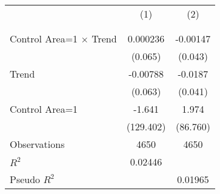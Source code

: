 {
\def\sym#1{\ifmmode^{#1}\else\(^{#1}\)\fi}
\begin{tabular}{l*{2}{c}}
\hline\hline
                    &&\\
                    &&\\
\hline
                 &               &               \\
Control Area=1 $\times$ Trend&    0.000236   &    -0.00147   \\
                    &     (0.065)   &     (0.043)   \\
[1em]
Trend               &    -0.00788   &     -0.0187   \\
                    &     (0.063)   &     (0.041)   \\
[1em]
Control Area=1      &      -1.641   &       1.974   \\
                    &   (129.402)   &    (86.760)   \\
\hline
Observations        &        4650   &        4650   \\
\(R^{2}\)           &     0.02446   &               \\
Pseudo \(R^{2}\)    &               &     0.01965   \\
\hline\hline
\end{tabular}
}
